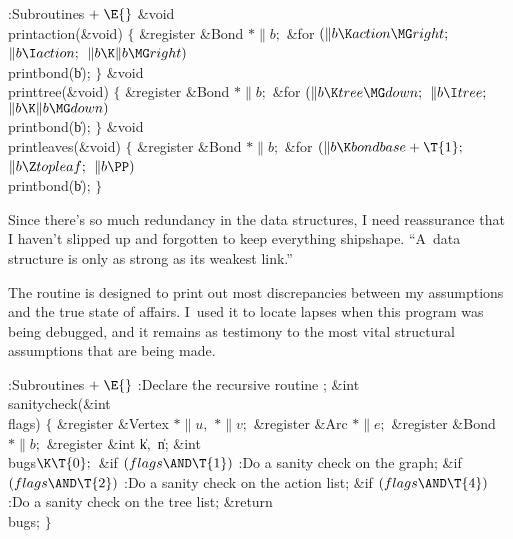 \B{}:Subroutines\X${}\mathrel+\E{}$\6
\&{void} \\{printaction}(\&{void})\6
${}\{{}$\1\6
\&{register} \&{Bond} ${}{*}\|b;{}$\7
\&{for} ${}(\|b\K\\{action}\MG\\{right};{}$ ${}\|b\I\\{action};{}$ ${}\|b\K\|b%
\MG\\{right}){}$\1\5
\\{printbond}(\|b);\2\6
\4${}\}{}$\2\7
\&{void} \\{printtree}(\&{void})\6
${}\{{}$\1\6
\&{register} \&{Bond} ${}{*}\|b;{}$\7
\&{for} ${}(\|b\K\\{tree}\MG\\{down};{}$ ${}\|b\I\\{tree};{}$ ${}\|b\K\|b\MG%
\\{down}){}$\1\5
\\{printbond}(\|b);\2\6
\4${}\}{}$\2\7
\&{void} \\{printleaves}(\&{void})\6
${}\{{}$\1\6
\&{register} \&{Bond} ${}{*}\|b;{}$\7
\&{for} ${}(\|b\K\\{bondbase}+\T{1};{}$ ${}\|b\Z\\{topleaf};{}$ ${}\|b\PP){}$\1%
\5
\\{printbond}(\|b);\2\6
\4${}\}{}$\2\par
\fi

Since there's so much redundancy in the data
structures, I need reassurance
that I haven't slipped up and forgotten to keep everything shipshape.
``A~data structure is only as strong as its weakest link.''

The 
routine is designed to print out most discrepancies between my assumptions and
the true state of affairs. I~used it to locate lapses when this program
was being debugged, and it remains as testimony to the most vital structural
assumptions that are being made.

\Y\B\4:Subroutines\X${}\mathrel+\E{}$\6
:Declare the recursive routine \X;\7
\&{int} \\{sanitycheck}(\&{int} \\{flags})\1\1\2\2\6
${}\{{}$\1\6
\&{register} \&{Vertex} ${}{*}\|u,{}$ ${}{*}\|v;{}$\6
\&{register} \&{Arc} ${}{*}\|e;{}$\6
\&{register} \&{Bond} ${}{*}\|b;{}$\6
\&{register} \&{int} \|k${},{}$ \|n;\6
\&{int} \\{bugs}${}\K\T{0};{}$\7
\&{if} ${}(\\{flags}\AND\T{1}){}$\1\5
:Do a sanity check on the graph\X;\2\6
\&{if} ${}(\\{flags}\AND\T{2}){}$\1\5
:Do a sanity check on the action list\X;\2\6
\&{if} ${}(\\{flags}\AND\T{4}){}$\1\5
:Do a sanity check on the tree list\X;\2\6
\&{return} \\{bugs};\6
\4${}\}{}$\2\par
\fi

